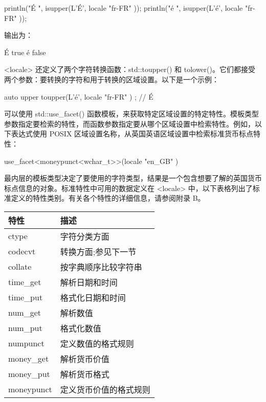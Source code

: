 \begin{cpp}
println("É {}", isupper(L'É', locale{ "fr-FR" }));
println("é {}", isupper(L'é', locale{ "fr-FR" }));
\end{cpp}

输出为：

\begin{shell}
É true
é false
\end{shell}


<locale> 还定义了两个字符转换函数：std::toupper() 和 tolower()。它们都接受两个参数：要转换的字符和用于转换的区域设置。以下是一个示例：

\begin{cpp}
auto upper { toupper(L'é', locale { "fr-FR" }) }; // É
\end{cpp}


可以使用 std::use\_facet() 函数模板，来获取特定区域设置的特定特性。模板类型参数指定要检索的特性，而函数参数指定要从哪个区域设置中检索特性。例如，以下表达式使用 POSIX 区域设置名称，从英国英语区域设置中检索标准货币标点特性：

\begin{cpp}
use_facet<moneypunct<wchar_t>>(locale { "en_GB" })
\end{cpp}

最内层的模板类型决定了要使用的字符类型，结果是一个包含想要了解的英国货币标点信息的对象。标准特性中可用的数据定义在 <locale> 中，以下表格列出了标准定义的特性类别。有关各个特性的详细信息，请参阅附录 B。

\begin{longtable}{|l|l|}
\hline
\textbf{特性} & \textbf{描述}                             \\ \hline
\endfirsthead
%
\endhead
%
ctype          & 字符分类方面                  \\ \hline
codecvt        & 转换方面;参见下一节              \\ \hline
collate        & 按字典顺序比较字符串              \\ \hline
time\_get      & 解析日期和时间                          \\ \hline
time\_put      & 格式化日期和时间                       \\ \hline
num\_get       & 解析数值                           \\ \hline
num\_put       & 格式化数值                        \\ \hline
numpunct       & 定义数值的格式规则  \\ \hline
money\_get     & 解析货币价值                          \\ \hline
money\_put     & 解析货币格式                       \\ \hline
moneypunct     & 定义货币价值的格式规则 \\ \hline
\end{longtable}


